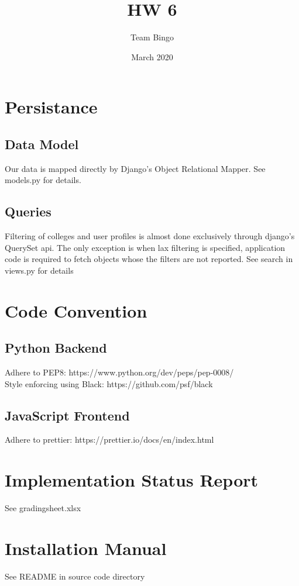 \documentclass{article}
\title{HW 6}
\author{Team Bingo}
\date{March 2020}
\begin{document}
\maketitle

\section{Persistance}

\subsection{Data Model}
Our data is mapped directly by Django's Object Relational Mapper. See models.py
for details. 

\subsection{Queries}
Filtering of colleges and user profiles is almost done exclusively through
django's QuerySet api. The only exception is when lax filtering is specified,
application code is required to fetch objects whose the filters are not
reported. See search in views.py for details

\section{Code Convention}

\subsection{Python Backend}
Adhere to PEP8: https://www.python.org/dev/peps/pep-0008/ \\ 
Style enforcing using Black: https://github.com/psf/black


\subsection{JavaScript Frontend}
Adhere to prettier: https://prettier.io/docs/en/index.html


\section{Implementation Status Report}
See gradingsheet.xlsx 

\section{Installation Manual}
See README in source code directory
\end{document}
